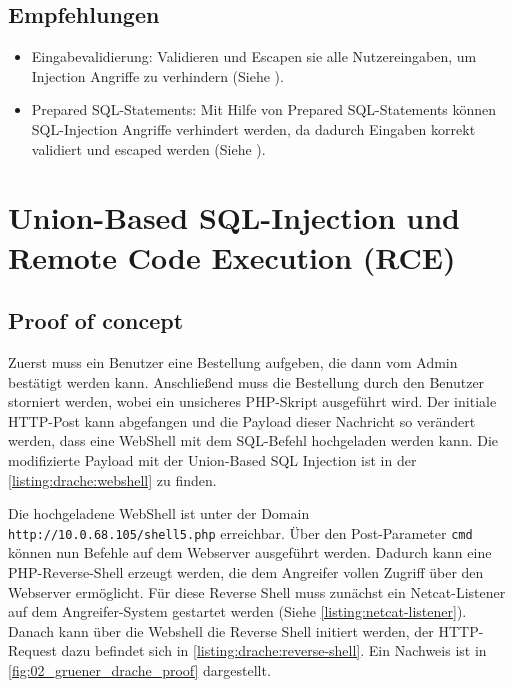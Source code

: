 \subsection*{Empfehlungen} 
\begin{itemize}
    \item Eingabevalidierung: Validieren und Escapen sie alle Nutzereingaben, um Injection Angriffe zu verhindern (Siehe \cite{owaspInputValidation}).
    \item Prepared SQL-Statements: Mit Hilfe von Prepared SQL-Statements können SQL-Injection Angriffe verhindert werden, da dadurch Eingaben korrekt validiert und escaped werden (Siehe \cite{owaspSQLInjectionPrevention}).
\end{itemize}


\section{\makecvssbadge Union-Based SQL-Injection und Remote Code Execution (RCE)}

\subsection*{Proof of concept}
Zuerst muss ein Benutzer eine Bestellung aufgeben, die dann vom Admin bestätigt werden kann. Anschließend muss die Bestellung durch den Benutzer storniert werden, wobei ein unsicheres PHP-Skript ausgeführt wird. Der initiale HTTP-Post kann abgefangen und die Payload dieser Nachricht so verändert werden, dass eine WebShell mit dem SQL-Befehl hochgeladen werden kann. Die modifizierte Payload mit der Union-Based SQL Injection ist in der \autoref{listing:drache:webshell} zu finden. 

Die hochgeladene WebShell ist unter der Domain \texttt{http://10.0.68.105/shell5.php} erreichbar. Über den Post-Parameter \texttt{cmd} können nun Befehle auf dem Webserver ausgeführt werden. Dadurch kann eine PHP-Reverse-Shell erzeugt werden, die dem Angreifer vollen Zugriff über den Webserver ermöglicht. Für diese Reverse Shell muss zunächst ein Netcat-Listener auf dem Angreifer-System gestartet werden (Siehe \autoref{listing:netcat-listener}). Danach kann über die Webshell die Reverse Shell initiert werden, der HTTP-Request dazu befindet sich in \autoref{listing:drache:reverse-shell}.  Ein Nachweis ist in \autoref{fig:02_gruener_drache_proof} dargestellt.

